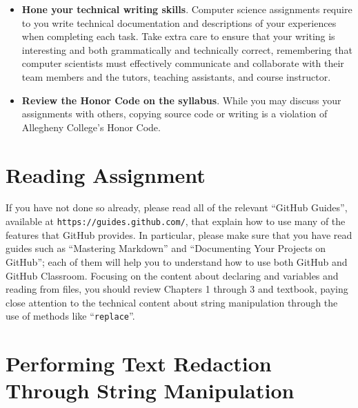 \documentclass[11pt]{article}
\newcommand{\command}[1]{``\lstinline{#1}''}
\newcommand{\url}[1]{\lstinline{#1}}
\begin{document}
\begin{itemize}
\item {\bf Hone your technical writing skills}. Computer science assignments
  require to you write technical documentation and descriptions of your
  experiences when completing each task. Take extra care to ensure that your
  writing is interesting and both grammatically and technically correct,
  remembering that computer scientists must effectively communicate and
  collaborate with their team members and the tutors, teaching assistants, and
  course instructor.

\item {\bf Review the Honor Code on the syllabus}. While you may discuss your
  assignments with others, copying source code or writing is a violation of
  Allegheny College's Honor Code.

\end{itemize}

\section*{Reading Assignment}

If you have not done so already, please read all of the relevant ``GitHub
Guides'', available at \url{https://guides.github.com/}, that explain how to use
many of the features that GitHub provides. In particular, please make sure that
you have read guides such as ``Mastering Markdown'' and ``Documenting Your
Projects on GitHub''; each of them will help you to understand how to use both
GitHub and GitHub Classroom. Focusing on the content about declaring and
variables and reading from files, you should review Chapters 1 through 3 and
textbook, paying close attention to the technical content about string
manipulation through the use of methods like \command{replace}.

\section*{Performing Text Redaction Through String Manipulation}
\end{document}
